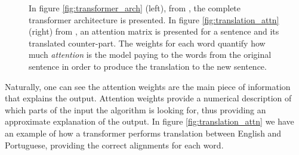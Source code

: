 \begin{figure}[!h] 
	\centering
	\hfill%
	\caption{In figure \ref{fig:transformer_arch} (left), from \cite{vaswani2023attention}, the complete transformer architecture is presented. In figure \ref{fig:translation_attn} (right) from \cite{translationmin2023attention}, an attention matrix is presented for a sentence and its translated counter-part. The weights for each word quantify how much \textit{attention} is the model paying to the words from the original sentence in order to produce the translation to the new sentence.}
\end{figure}


Naturally, one can see the attention weights are the main piece of information that explains the output. Attention weights provide a numerical description of which parts of the input the algorithm is looking for, thus providing an approximate explanation of the output. In figure \ref{fig:translation_attn} we have an example of how a transformer performs translation between English and Portuguese, providing the correct alignments for each word. 


